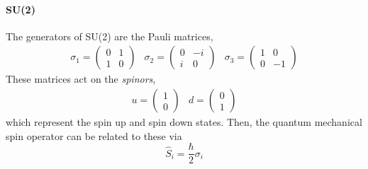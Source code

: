 \paragraph{SU(2)}
The generators of SU(2) are the Pauli matrices,
\begin{equation*}
  \begin{matrix}
    \sigma_1 = \begin{pmatrix} 0 & 1 \\ 1 & 0 \end{pmatrix} &
    \sigma_2 = \begin{pmatrix}  0 & -i \\ i & 0 \end{pmatrix} &
    \sigma_3 = \begin{pmatrix}  1 & 0 \\ 0 & -1 \end{pmatrix}
  \end{matrix}
\end{equation*}
These matrices act on the \emph{spinors}, 
\begin{equation*}
  \begin{matrix}
    u = \begin{pmatrix} 1 \\ 0 \end{pmatrix} &
    d = \begin{pmatrix} 0 \\ 1 \end{pmatrix}
  \end{matrix}
\end{equation*}
which represent the spin up and spin down states. Then, the quantum
mechanical spin operator can be related to these via 
\begin{equation}
  \label{eq:spinoperator}
  \hat{S}_i = \frac{\hbar}{2} \sigma_i
\end{equation}
